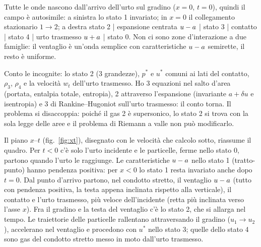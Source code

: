 Tutte le onde nascono dall'arrivo dell'urto sul gradino ($x=0$, $t=0$), quindi il campo è autosimile: a sinistra lo
stato 1 invariato; in $x=0$ il collegamento stazionario $1\to2$; a destra stato 2 | espansione centrata $u-a$ |
stato 3 | contatto | stato 4 | urto trasmesso $u+a$ | stato 0. Non ci sono zone d'interazione a due famiglie: il
ventaglio è un'onda semplice con caratteristiche $u-a$ semirette, il resto è uniforme.

Conto le incognite: lo stato 2 (3 grandezze), $p^*$ e $u^*$ comuni ai lati del contatto, $\rho_3$, $\rho_4$ e la
velocità $w_t$ dell'urto trasmesso. Ho 3 equazioni nel salto d'area (portata, entalpia totale, entropia), 2
attraverso l'espansione (invariante $a+\delta u$ e isentropia) e 3 di Rankine--Hugoniot sull'urto trasmesso: il conto
torna. Il problema si disaccoppia: poiché il gas 2 è supersonico, lo stato 2 si trova con la sola legge delle aree e
il problema di Riemann a valle non può modificarlo.


Il piano $x$--$t$ (fig.~\ref{fig:xt}), disegnato con le velocità che calcolo sotto, riassume il quadro. Per $t<0$ c'è
solo l'urto incidente e le particelle, ferme nello stato 0, partono quando l'urto le raggiunge. Le caratteristiche
$u-a$ nello stato 1 (tratto-punto) hanno pendenza positiva: per $x<0$ lo stato 1 resta invariato anche dopo $t=0$.
Dal punto d'arrivo partono, nel condotto stretto, il ventaglio $u-a$ (tutto con pendenza positiva, la testa appena
inclinata rispetto alla verticale), il contatto e l'urto trasmesso, più veloce dell'incidente (retta più inclinata
verso l'asse $x$). Fra il gradino e la testa del ventaglio c'è lo stato 2, che si allarga nel tempo. Le traiettorie
delle particelle rallentano attraversando il gradino ($u_1\to u_2$), accelerano nel ventaglio e procedono con $u^*$
nello stato 3; quelle dello stato 4 sono gas del condotto stretto messo in moto dall'urto trasmesso.

